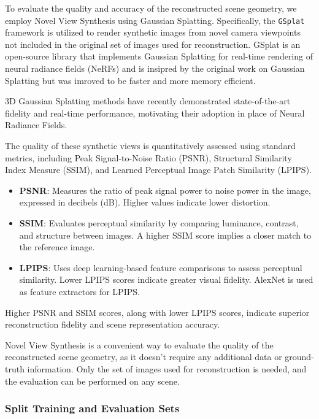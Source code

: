 To evaluate the quality and accuracy of the reconstructed scene geometry, we employ Novel View Synthesis using Gaussian Splatting.
Specifically, the \texttt{GSplat} \cite{ye2024gsplatopensourcelibrarygaussian} framework is utilized to render synthetic images from novel camera viewpoints not included in the original set of images used for reconstruction. 
GSplat is an open-source library that implements Gaussian Splatting for real-time rendering of neural radiance fields (NeRFs) and is insipred by the original work on Gaussian Splatting \cite{kerbl20233dgaussiansplattingrealtime} but was imroved to be faster and more memory efficient.

3D Gaussian Splatting methods have recently demonstrated state-of-the-art fidelity and real-time performance, motivating their adoption in place of Neural Radiance Fields.

The quality of these synthetic views is quantitatively assessed using standard metrics, including Peak Signal-to-Noise Ratio (PSNR), Structural Similarity Index Measure (SSIM), and Learned Perceptual Image Patch Similarity (LPIPS). 

\begin{itemize}
    \item \textbf{PSNR}: Measures the ratio of peak signal power to noise power in the image, expressed in decibels (dB). Higher values indicate lower distortion.
    \item \textbf{SSIM}: Evaluates perceptual similarity by comparing luminance, contrast, and structure between images. A higher SSIM score implies a closer match to the reference image.
    \item \textbf{LPIPS}: Uses deep learning-based feature comparisons to assess perceptual similarity. Lower LPIPS scores indicate greater visual fidelity. AlexNet \cite{krizhevsky2012imagenet} is used as feature extractors for LPIPS.
\end{itemize}

Higher PSNR and SSIM scores, along with lower LPIPS scores, indicate superior reconstruction fidelity and scene representation accuracy.

Novel View Synthesis is a convenient way to evaluate the quality of the reconstructed scene geometry, as it doesn't require any additional data or ground-truth information.
Only the set of images used for reconstruction is needed, and the evaluation can be performed on any scene.

\subsubsection{Split Training and Evaluation Sets}\label{sec:split_sets}

